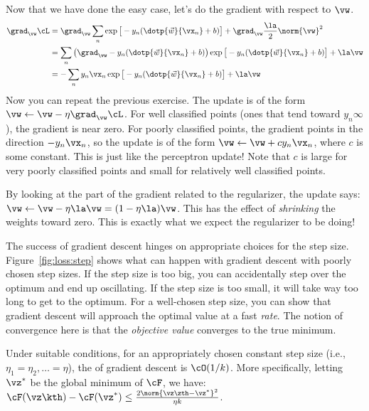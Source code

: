 Now that we have done the easy case, let's do the gradient with
respect to $\vw$.
%
\begin{align}
\grad_\vw \cL
&= \grad_\vw \sum_n \exp\big[-y_n (\dotp{\vec w}{\vx_n}+b)\big]
 + \grad_\vw\frac \la 2 \norm{\vw}^2 \\
&= \sum_n \left( \grad_\vw -y_n (\dotp{\vec w}{\vx_n}+b) \right) \exp\big[-y_n (\dotp{\vec w}{\vx_n}+b)\big]
 + \la \vw \\
&= -\sum_n y_n \vx_n \exp\big[-y_n (\dotp{\vec w}{\vx_n}+b)\big]
 + \la \vw
\end{align}
%
Now you can repeat the previous exercise.  The update is of the form
$\vw \leftarrow \vw - \eta \grad_\vw \cL$.  For well classified points
(ones that tend toward $y_n \infty$), the gradient is near zero.
For poorly classified points, the gradient points in the direction
$-y_n\vx_n$, so the update is of the form $\vw \leftarrow \vw + c
y_n\vx_n$, where $c$ is some constant.  This is just like the
perceptron update!  Note that $c$ is large for very poorly classified
points and small for relatively well classified points.

By looking at the part of the gradient related to the regularizer, the
update says: $\vw \leftarrow \vw - \eta \la \vw = (1- \eta \la) \vw$.  This has
the effect of \emph{shrinking} the weights toward zero.  This is
exactly what we expect the regularizer to be doing!


The success of gradient descent hinges on appropriate choices for the
step size.  Figure~\ref{fig:loss:step} shows what can happen with
gradient descent with poorly chosen step sizes.  If the step size is
too big, you can accidentally step over the optimum and end up
oscillating.  If the step size is too small, it will take way too long
to get to the optimum.  For a well-chosen step size, you can show that
gradient descent will approach the optimal value at a fast
\emph{rate}.  The notion of convergence here is that the
\emph{objective value} converges to the true minimum.

\begin{theorem} \label{thm:loss:gd}
  Under suitable conditions, for an appropriately chosen
  constant step size (i.e., $\eta_1 = \eta_2, \dots = \eta$), the
   of gradient descent is $\cO(1/k)$.  More
  specifically, letting $\vz^*$ be the global minimum of $\cF$, we
  have: $\cF(\vz\kth) - \cF(\vz^*) \leq \frac {2
    \norm{\vz\zth-\vz^*}^2} {\eta k}$.
\end{theorem}

